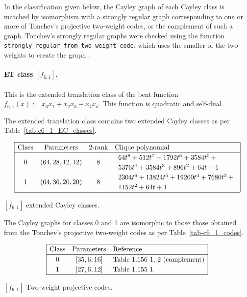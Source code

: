 \documentclass[12pt,a4paper]{article}
\begin{document}
In the classification given below, the Cayley graph of each Cayley class is matched by isomorphism
with a strongly regular graph corresponding to one
or more of Tonchev's projective two-weight codes, or the complement of such a graph.
Tonchev's strongly regular graphs were checked using the function
\verb!strongly_regular_from_two_weight_code!, which uses the smaller of the two weights to create the graph
\cite{SageMath7517}.
%
\paragraph*{ET class $[f_{6,1}]$.}
%
This is the extended translation class of the bent function
$f_{6,1}(x) := x_0 x_1 + x_2 x_3 + x_4 x_5.$
This function is quadratic and self-dual.

The extended translation class contains two extended Cayley classes as per Table~\ref{tab-c6_1_EC_classes}.

\begin{table}[!bhpt] %
%
\small{}
\begin{align*}
\def\arraystretch{1.2}
\begin{array}{|cccl|}
\hline
\text{Class} &
\text{Parameters} &
\text{2-rank} &
\text{Clique polynomial}
\\
\hline
0 &
(64, 28, 12, 12) &
8 &
\begin{array}{l}
64t^{8} + 512t^{7} + 1792t^{6} + 3584t^{5}
\,+
\\
 5376t^{4} + 3584t^{3} + 896t^{2} + 64t + 1
\end{array}
\\
1 &
(64, 36, 20, 20) &
8 &
\begin{array}{l}
2304t^{6} + 13824t^{5} + 19200t^{4} + 7680t^{3}
\,+
\\
 1152t^{2} + 64t + 1
\end{array}
\\
\hline
\end{array}
\end{align*}
%
\caption{$[f_{6,1}]$ extended Cayley classes.}
\label{tab-c6_1_EC_classes}
\end{table}

The Cayley graphs for classes 0 and 1 are isomorphic to those those obtained from the
Tonchev's projective two-weight codes \cite{Ton07codes} as per Table~\ref{tab-c6_1_codes}.

\begin{table}[!bhpt] %
\small{
\begin{align*}
\def\arraystretch{1.2}
\begin{array}{|ccl|}
\hline
\text{Class} &
\text{Parameters} & \text{Reference}
\\
\hline
0 & [35,6,16] & \text{Table 1.156 1, 2 (complement)}
\\
1 & [27,6,12] & \text{Table 1.155 1 }
\\
\hline
\end{array}
\end{align*}
}
\caption{$[f_{6,1}]$ Two-weight projective codes.}
\label{tab-c6_1_codes}
\end{table}
\end{document}
